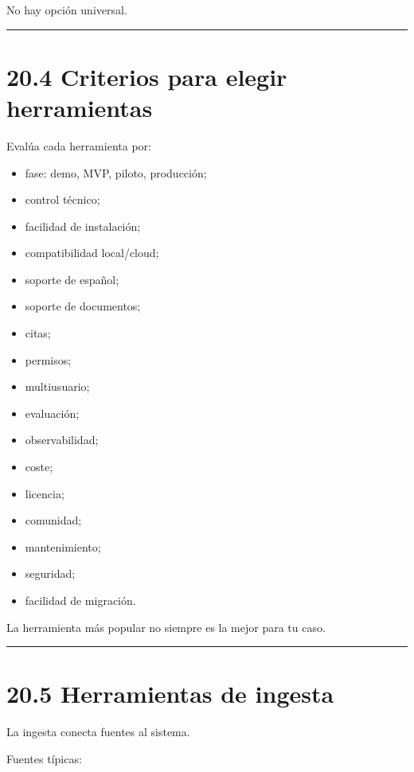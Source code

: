 No hay opción universal.

\begin{center}\rule{0.5\linewidth}{0.5pt}\end{center}

\section{20.4 Criterios para elegir
herramientas}\label{criterios-para-elegir-herramientas}

Evalúa cada herramienta por:

\begin{itemize}
\tightlist
\item
  fase: demo, MVP, piloto, producción;
\item
  control técnico;
\item
  facilidad de instalación;
\item
  compatibilidad local/cloud;
\item
  soporte de español;
\item
  soporte de documentos;
\item
  citas;
\item
  permisos;
\item
  multiusuario;
\item
  evaluación;
\item
  observabilidad;
\item
  coste;
\item
  licencia;
\item
  comunidad;
\item
  mantenimiento;
\item
  seguridad;
\item
  facilidad de migración.
\end{itemize}

La herramienta más popular no siempre es la mejor para tu caso.

\begin{center}\rule{0.5\linewidth}{0.5pt}\end{center}

\section{20.5 Herramientas de ingesta}\label{herramientas-de-ingesta}

La ingesta conecta fuentes al sistema.

Fuentes típicas:

